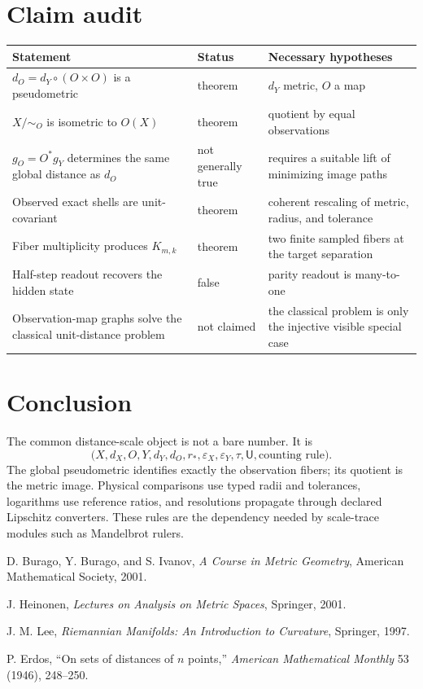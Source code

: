 \documentclass[11pt,a4paper]{article}
\theoremstyle{definition}
\theoremstyle{plain}
\theoremstyle{remark}
\begin{document}
\section{Claim audit}

\begin{longtable}{L{0.44\textwidth}L{0.20\textwidth}L{0.26\textwidth}}
\toprule
Statement & Status & Necessary hypotheses\\
\midrule
\endhead
$d_O=d_Y\circ(O\times O)$ is a pseudometric & theorem & $d_Y$ metric,
$O$ a map\\
$X/{\sim_O}$ is isometric to $O(X)$ & theorem & quotient by equal
observations\\
$g_O=O^*g_Y$ determines the same global distance as $d_O$ & not generally
true & requires a suitable lift of minimizing image paths\\
Observed exact shells are unit-covariant & theorem & coherent rescaling
of metric, radius, and tolerance\\
Fiber multiplicity produces $K_{m,k}$ & theorem & two finite sampled
fibers at the target separation\\
Half-step readout recovers the hidden state & false & parity readout is
many-to-one\\
Observation-map graphs solve the classical unit-distance problem & not
claimed & the classical problem is only the injective visible special
case\\
\bottomrule
\end{longtable}

\section{Conclusion}

The common distance-scale object is not a bare number. It is
\[
\bigl(X,d_X,O,Y,d_Y,d_O,r_*,
\varepsilon_X,\varepsilon_Y,\tau,\mathsf U,\text{counting rule}\bigr).
\]
The global pseudometric identifies exactly the observation fibers; its
quotient is the metric image. Physical comparisons use typed radii and
tolerances, logarithms use reference ratios, and resolutions propagate
through declared Lipschitz converters. These rules are the dependency
needed by scale-trace modules such as Mandelbrot rulers.

\begin{thebibliography}{9}

D. Burago, Y. Burago, and S. Ivanov,
\emph{A Course in Metric Geometry},
American Mathematical Society, 2001.

J. Heinonen,
\emph{Lectures on Analysis on Metric Spaces},
Springer, 2001.

J. M. Lee,
\emph{Riemannian Manifolds: An Introduction to Curvature},
Springer, 1997.

P. Erdos,
``On sets of distances of $n$ points,''
\emph{American Mathematical Monthly} 53 (1946), 248--250.

\end{thebibliography}
\end{document}
